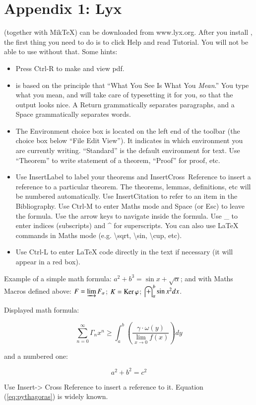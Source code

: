 
\chapter*{Appendix 1: Lyx}


\LyX{} (together with Mik\TeX{}) can be downloaded from www.lyx.org.
After you install \LyX{}, the first thing you need to do is to click
Help and read Tutorial. You will not be able to use \LyX{} without
that. Some hints: 
\begin{itemize}
\item Press Ctrl-R to make and view pdf. 
\item \LyX{} is based on the principle that ``What You See Is What You
\emph{Mean}.'' You type what you mean, and \LyX{} will take care
of typesetting it for you, so that the output looks nice. A \textsf{Return}
grammatically separates paragraphs, and a \textsf{Space} grammatically
separates words.
\item The \textsf{Environment} choice box is located on the left end of
the toolbar (the choice box below \textsf{``File Edit View}'').
It indicates in which environment you are currently writing. ``Standard''
is the default environment for text. Use ``Theorem'' to write statement
of a theorem, ``Proof'' for proof, etc. 
\item Use \textsf{Insert\lyxarrow{}Label} to label your theorems and \textsf{Insert\lyxarrow{}Cross~Reference}
to insert a reference to a particular theorem. The theorems, lemmas,
definitions, etc will be numbered automatically. Use \textsf{Insert\lyxarrow{}Citation}
to refer to an item in the Bibliography. Use Ctrl-M to enter Maths
mode and \textsf{Space} (or \textsf{Esc)} to leave the formula. Use
the arrow keys to navigate inside the formula. Use \_ to enter indices
(subscripts) and \textasciicircum{} for superscripts. You can also
use \LaTeX{} commands in Maths mode (e.g. \textbackslash{}sqrt, \textbackslash{}sin,
\textbackslash{}cup, etc).
\item Use Ctrl-L to enter \LaTeX{} code directly in the text if necessary
(it will appear in a red box). 
\end{itemize}
Example of a simple math formula: $a^{2}+b^{3}=\sin x+\sqrt{\alpha}$;
and with Maths Macros defined above: $F=\operatorname{\underrightarrow{{\rm lim}}} F_{\alpha}$; $K=\operatorname{\rm Ker}\varphi$;
$\int_{a}^{b}\sin x^{2}dx$.

Displayed math formula:

\[
\sum_{n=0}^{\infty}\Gamma_{n}x^{n}\ge\int_{a}^{b}\left(\frac{\gamma\cdot\omega(y)}{\lim_{x\to0}f(x)}\right)dy
\]


and a numbered one:

\begin{equation}
a^{2}+b^{2}=c^{2}\label{eq:pythagoras}
\end{equation}


Use Insert-> Cross Reference to insert a reference to it. Equation
(\ref{eq:pythagoras}) is widely known.
